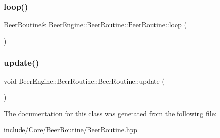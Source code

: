 \mbox{\label{class_beer_engine_1_1_beer_routine_1_1_beer_routine_a2e521613bf057c806b73a2b0855f7a1f}} 
\subsubsection{\texorpdfstring{loop()}{loop()}}
{\footnotesize\ttfamily \mbox{\hyperlink{class_beer_engine_1_1_beer_routine_1_1_beer_routine}{Beer\+Routine}}\& Beer\+Engine\+::\+Beer\+Routine\+::\+Beer\+Routine\+::loop (\begin{DoxyParamCaption}{ }\end{DoxyParamCaption})}

\mbox{\label{class_beer_engine_1_1_beer_routine_1_1_beer_routine_af210700097e82efb5c60ef68c73cb900}} 
\subsubsection{\texorpdfstring{update()}{update()}}
{\footnotesize\ttfamily void Beer\+Engine\+::\+Beer\+Routine\+::\+Beer\+Routine\+::update (\begin{DoxyParamCaption}{ }\end{DoxyParamCaption})}



The documentation for this class was generated from the following file\+:\begin{DoxyCompactItemize}
\item 
include/\+Core/\+Beer\+Routine/\mbox{\hyperlink{_beer_routine_8hpp}{Beer\+Routine.\+hpp}}\end{DoxyCompactItemize}
